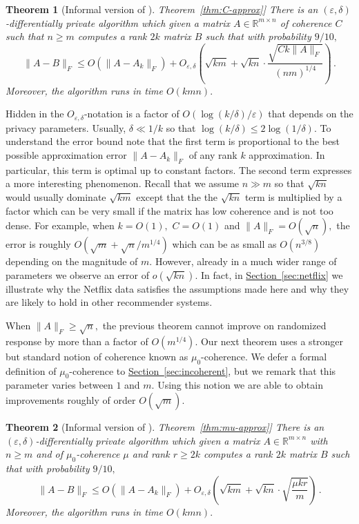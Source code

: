 \documentclass[letterpaper,11pt]{article}
\newtheorem{theorem}{Theorem}[section]
\theoremstyle{definition}
\newcommand{\sectionref}[1]{\hyperref[sec:#1]{Section~\ref{sec:#1}}}
\newcommand{\theoremlabel}[1]{\label{thm:#1}}
\newcommand{\theoremref}[1]{\hyperref[thm:#1]{Theorem~\ref{thm:#1}}}
\newcommand{\mper}{\,.}
\renewcommand{\le}{\leqslant}
\renewcommand{\ge}{\geqslant}
\newcommand{\R}{\mathbb{R}}
\renewcommand{\epsilon}{\varepsilon}
\begin{document}
\begin{theorem}[Informal version of \theoremref{C-approx}]
\theoremlabel{informal1}
There is an $(\epsilon,\delta)$-differentially private algorithm which given a
matrix $A\in\R^{m\times n}$ of coherence $C$ such that $n\ge m$
computes a rank $2k$ matrix $B$ such that with probability $9/10,$
\[
\|A-B\|_F
\le O\left(\|A-A_k\|_F\right)
+ O_{\epsilon,\delta}\left(
\sqrt{km} + \sqrt{kn}\cdot \frac{\sqrt{Ck\|A\|_F}}{(nm)^{1/4}}\right)\mper
\]
Moreover, the algorithm runs in time $O(kmn).$
\end{theorem}
Hidden in the $O_{\epsilon,\delta}$-notation is a factor of
$O(\log(k/\delta)/\epsilon)$ that depends on the privacy parameters.
Usually, $\delta\ll 1/k$ so that
$\log(k/\delta)\le 2\log(1/\delta).$
To understand the error bound note that the first term is proportional to the
best possible approximation error $\|A-A_k\|_F$ of any rank $k$
approximation. In particular, this term is optimal up to constant factors.
The second term expresses a more interesting phenomenon. Recall that we assume
$n\gg m$ so that $\sqrt{kn}$ would usually dominate $\sqrt{km}$ except that the
the $\sqrt{kn}$ term is multiplied by a factor which can be very
small if the matrix has low coherence and is not too dense. For example, when
$k=O(1),$ $C=O(1)$ and $\|A\|_F=O(\sqrt{n}),$ the error is roughly
$O(\sqrt{m}+\sqrt{n}/m^{1/4})$ which can be as small as $O(n^{3/8})$ depending
on the magnitude of $m.$ However, already in a much wider range of parameters we
observe an error of $o(\sqrt{kn}).$ In fact, in \sectionref{netflix} we
illustrate why the Netflix data satisfies the assumptions made
here and why they are likely to hold in other recommender systems.

When $\|A\|_F\ge \sqrt{n},$ the previous theorem cannot improve on randomized
response by more than a factor of $O(m^{1/4}).$ Our next theorem uses a
stronger but standard notion of coherence known as $\mu_0$-coherence. We
defer a formal definition of $\mu_0$-coherence to \sectionref{incoherent}, but
we remark that this parameter varies between $1$ and $m.$ Using this notion we
are able to obtain improvements roughly of order $O(\sqrt{m}).$

\begin{theorem}[Informal version of \theoremref{mu-approx}]
\theoremlabel{informal2}
There is an $(\epsilon,\delta)$-differentially private algorithm which given a
matrix $A\in\R^{m\times n}$ with $n\ge m$ and of $\mu_0$-coherence $\mu$ and
rank $r\ge 2k$ computes a rank $2k$ matrix $B$ such that with
probability $9/10,$
\[
\|A-B\|_F
\le O\left(\|A-A_k\|_F\right)
+ O_{\epsilon,\delta}\left(
\sqrt{km} + \sqrt{kn}\cdot \sqrt{\frac{\mu kr}{m}}\right)\mper
\]
Moreover, the algorithm runs in time $O(kmn).$
\end{theorem}
\end{document}
